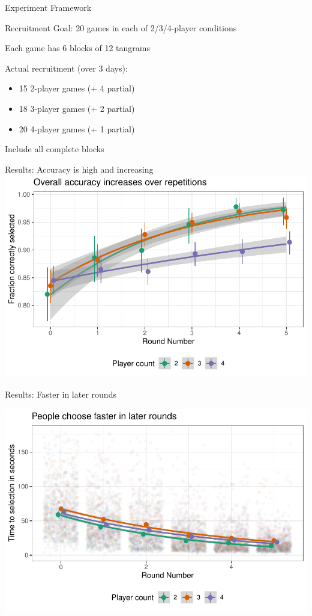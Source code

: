 \documentclass[ 12pt, xcolor=beamer,table,usenames,dvipsnames, ignorenonframetext, ngerman]{beamer}
\begin{document}
\begin{frame}{Experiment Framework}
{}
\end{frame}
\begin{frame}{\large Recruitment}
	Goal: 20 games in each of 2/3/4-player conditions
	
	Each game has 6 blocks of 12 tangrams\pause
	
	\medskip
	
	Actual recruitment (over 3 days):
	\begin{itemize}
		\item 15 2-player games (+ 4 partial)
		\item 18 3-player games (+ 2 partial)
		\item 20 4-player games (+ 1 partial)
	\end{itemize}
Include all complete blocks

\end{frame}


\begin{frame}{\large Results:  Accuracy is high and increasing}
	\includegraphics[width=\textwidth]{../images/accuracy.pdf}

\end{frame}

\begin{frame}{\large Results: 	Faster in later rounds}
	
	\includegraphics[width=\textwidth]{../images/time.pdf}


\end{frame}
\end{document}
